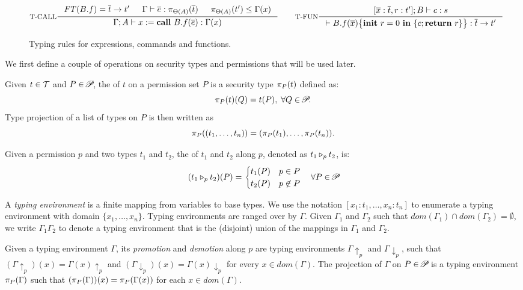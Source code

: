 {{{\begin{figure*}
\[
\inference[T-CALL]
{\FT(B.f) = \overline{t} \rightarrow t' &
\Gamma \vdash \overline{e} : \app{\overline{t}}{\Theta(A)} &
\app{t'}{\Theta(A)} \leq \Gamma(x)}
{\Gamma; A \vdash \lcCALL{x}{B.f}{\overline{e}} :
 \Gamma(x)  }
\qquad
\inference[T-FUN]
{[\overline{x}:\overline{t}, r : t'] ; B\vdash c : s}
{ \vdash \lpFUN{B.f}{\overline{x}}{c} :
  \overline{t} \rightarrow t'}
\]
\caption{Typing rules for expressions, commands and functions.}
\label{fig:typing-rules}
\end{figure*}


 
We first define a couple of operations on security types and permissions that will
be used later.

\begin{definition}\label{def:projection}
Given $t\in\Tcal$ and $P\in\PPS$, the  of $t$ on a permission set $P$ is a security type  $\app{t}{P}$ defined as: \begin{equation*}
\app{t}{P}(Q) = t(P),\; \forall Q\in \PPS.
\end{equation*}
Type projection of a list of types
on $P$ is then written as
\[
\app{(t_1,\dots,t_n)}{P} = (\app{t_1}{P}, \dots, \app{t_n}{P}).
\]
\end{definition}

\begin{definition}\label{def:merge}
Given a permission $p$ and two types $t_1$ and $t_2$, the {} of
$t_1$ and $t_2$ along $p$, denoted as $\omerge {p} {t_1} {t_2}$, is:
\begin{equation*}
(\omerge p {t_1} {t_2}) (P) =
\begin{cases}
t_1(P) & p\in P \\
t_2(P) & p\not\in P\\
\end{cases}
\quad\forall P\in{\PPS}
\end{equation*}
\end{definition}

A {\em typing environment} is a finite mapping from variables to base types.
We use the notation  $[x_1 : t_1, \dots, x_n : t_n]$
to enumerate a typing environment with domain $\{x_1,\dots,x_n\}.$
Typing environments are ranged over by $\Gamma.$
Given $\Gamma_1$ and $\Gamma_2$ such that $dom(\Gamma_1) \cap dom(\Gamma_2) = \emptyset$,
we write $\Gamma_1\Gamma_2$ to denote a typing environment that is the (disjoint) union of the mappings
in $\Gamma_1$ and $\Gamma_2$.

\begin{definition}\label{def:tenv-pd}
  Given a typing environment $\Gamma$, its {\em promotion} and {\em demotion} along $p$
  are typing environments $\Gamma\!\uparrow_p$ and $\Gamma\!\downarrow_p$, such that
$(\Gamma\!\uparrow_{p})(x) = \Gamma(x)\!\uparrow_{p}$ and
$(\Gamma\!\downarrow_{p})(x) = \Gamma(x)\!\downarrow_{p}$ for every $x \in dom(\Gamma).$
  The projection of $\Gamma$ on $P \in \PPS$ is a typing environment $\app{\Gamma}{P}$ such that
$(\app{\Gamma}{P})(x) = \app{\Gamma(x)}{P}$ for each $x \in dom(\Gamma).$
\end{definition}

}}}
